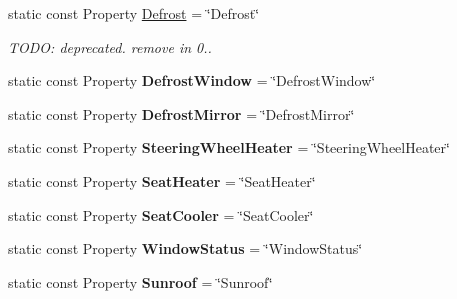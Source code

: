 \begin{DoxyCompactItemize}
\item 
\hypertarget{classVehicleProperty_a1f1ade6fb94a977e8dbc31b3a90b1cc3}{static const Property \hyperlink{classVehicleProperty_a1f1ade6fb94a977e8dbc31b3a90b1cc3}{Defrost} = \char`\"{}Defrost\char`\"{}}\label{classVehicleProperty_a1f1ade6fb94a977e8dbc31b3a90b1cc3}

\begin{DoxyCompactList}\small\item\em T\-O\-D\-O\-: deprecated. remove in 0.. \end{DoxyCompactList}\item 
\hypertarget{classVehicleProperty_a09d9a372040ca6ab43bb77e037fe0c26}{static const Property {\bfseries Defrost\-Window} = \char`\"{}Defrost\-Window\char`\"{}}\label{classVehicleProperty_a09d9a372040ca6ab43bb77e037fe0c26}

\item 
\hypertarget{classVehicleProperty_a08afe7a9d7dec0fcf7946a7d0715f27a}{static const Property {\bfseries Defrost\-Mirror} = \char`\"{}Defrost\-Mirror\char`\"{}}\label{classVehicleProperty_a08afe7a9d7dec0fcf7946a7d0715f27a}

\item 
\hypertarget{classVehicleProperty_a50ba22b48049e141acfd9c24549573c2}{static const Property {\bfseries Steering\-Wheel\-Heater} = \char`\"{}Steering\-Wheel\-Heater\char`\"{}}\label{classVehicleProperty_a50ba22b48049e141acfd9c24549573c2}

\item 
\hypertarget{classVehicleProperty_aaf891a6fb7485be67ab8dfae96636076}{static const Property {\bfseries Seat\-Heater} = \char`\"{}Seat\-Heater\char`\"{}}\label{classVehicleProperty_aaf891a6fb7485be67ab8dfae96636076}

\item 
\hypertarget{classVehicleProperty_aa5ccd72b6b86bd1741d05281fb0490c6}{static const Property {\bfseries Seat\-Cooler} = \char`\"{}Seat\-Cooler\char`\"{}}\label{classVehicleProperty_aa5ccd72b6b86bd1741d05281fb0490c6}

\item 
\hypertarget{classVehicleProperty_aafce44d9eb4eb200970bf1146cdd77d3}{static const Property {\bfseries Window\-Status} = \char`\"{}Window\-Status\char`\"{}}\label{classVehicleProperty_aafce44d9eb4eb200970bf1146cdd77d3}

\item 
\hypertarget{classVehicleProperty_ae7498970718f7bf52ef6a5800084b91b}{static const Property {\bfseries Sunroof} = \char`\"{}Sunroof\char`\"{}}\label{classVehicleProperty_ae7498970718f7bf52ef6a5800084b91b}


\end{DoxyCompactItemize}
